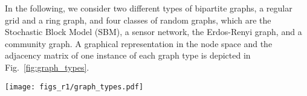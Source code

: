 \documentclass[journal]{IEEEtran}
\begin{document}
In the following, we consider two different types of bipartite graphs, a regular grid and a ring graph, and four classes of random graphs, which are the Stochastic Block Model (SBM), a sensor network, the Erdos-Renyi graph, and a community graph. 
A graphical representation in the node space and the adjacency matrix of one instance of each graph type is depicted in Fig.~\ref{fig:graph_types}.

\begin{figure*}[!ht]
    \centering
    \texttt{[image: figs\_r1/graph\_types.pdf]} 
    \caption{Graphical representation and adjacency matrix of 2 regular graphs (\textit{Regular grid} and \textit{Ring}) and an instance of 4 random graphs (\textit{Stochastic Block Model (SBM)}, \textit{Sensor network}, \textit{Erdos-Renyi graph}, and \textit{Community graph}).}
    \label{fig:graph_types}
\end{figure*}
\end{document}
